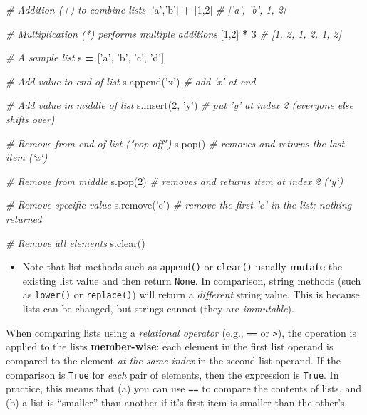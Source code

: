 \documentclass[]{book}
\newenvironment{Shaded}{\begin{snugshade}}{\end{snugshade}}
\newcommand{\DecValTok}[1]{\textcolor[rgb]{0.00,0.00,0.81}{#1}}
\newcommand{\StringTok}[1]{\textcolor[rgb]{0.31,0.60,0.02}{#1}}
\newcommand{\CommentTok}[1]{\textcolor[rgb]{0.56,0.35,0.01}{\textit{#1}}}
\newcommand{\OperatorTok}[1]{\textcolor[rgb]{0.81,0.36,0.00}{\textbf{#1}}}
\newcommand{\NormalTok}[1]{#1}
\providecommand{\tightlist}{%
  \setlength{\itemsep}{0pt}\setlength{\parskip}{0pt}}
\begin{document}
\begin{Shaded}
\begin{Highlighting}[]
\CommentTok{# Addition (+) to combine lists}
\NormalTok{[}\StringTok{'a'}\NormalTok{,}\StringTok{'b'}\NormalTok{] }\OperatorTok{+}\NormalTok{ [}\DecValTok{1}\NormalTok{,}\DecValTok{2}\NormalTok{]  }\CommentTok{# ['a', 'b', 1, 2]}

\CommentTok{# Multiplication (*) performs multiple additions}
\NormalTok{[}\DecValTok{1}\NormalTok{,}\DecValTok{2}\NormalTok{] }\OperatorTok{*} \DecValTok{3}  \CommentTok{# [1, 2, 1, 2, 1, 2]}

\CommentTok{# A sample list}
\NormalTok{s }\OperatorTok{=}\NormalTok{ [}\StringTok{'a'}\NormalTok{, }\StringTok{'b'}\NormalTok{, }\StringTok{'c'}\NormalTok{, }\StringTok{'d'}\NormalTok{]}

\CommentTok{# Add value to end of list}
\NormalTok{s.append(}\StringTok{'x'}\NormalTok{)  }\CommentTok{# add 'x' at end}

\CommentTok{# Add value in middle of list}
\NormalTok{s.insert(}\DecValTok{2}\NormalTok{, }\StringTok{'y'}\NormalTok{)  }\CommentTok{# put 'y' at index 2 (everyone else shifts over)}

\CommentTok{# Remove from end of list ("pop off")}
\NormalTok{s.pop()  }\CommentTok{# removes and returns the last item (`x`)}

\CommentTok{# Remove from middle}
\NormalTok{s.pop(}\DecValTok{2}\NormalTok{)  }\CommentTok{# removes and returns item at index 2 (`y`)}

\CommentTok{# Remove specific value}
\NormalTok{s.remove(}\StringTok{'c'}\NormalTok{)  }\CommentTok{# remove the first 'c' in the list; nothing returned}

\CommentTok{# Remove all elements}
\NormalTok{s.clear()}
\end{Highlighting}
\end{Shaded}

\begin{itemize}
\tightlist
\item
  Note that list methods such as \texttt{append()} or \texttt{clear()}
  usually \textbf{mutate} the existing list value and then return
  \texttt{None}. In comparison, string methods (such as \texttt{lower()}
  or \texttt{replace()}) will return a \emph{different} string value.
  This is because lists can be changed, but strings cannot (they are
  \emph{immutable}).
\end{itemize}

When comparing lists using a \emph{relational operator} (e.g.,
\texttt{==} or \texttt{\textgreater{}}), the operation is applied to the
lists \textbf{member-wise}: each element in the first list operand is
compared to the element \emph{at the same index} in the second list
operand. If the comparison is \texttt{True} for \emph{each} pair of
elements, then the expression is \texttt{True}. In practice, this means
that (a) you can use \texttt{==} to compare the contents of lists, and
(b) a list is ``smaller'' than another if it's first item is smaller
than the other's.
\end{document}
